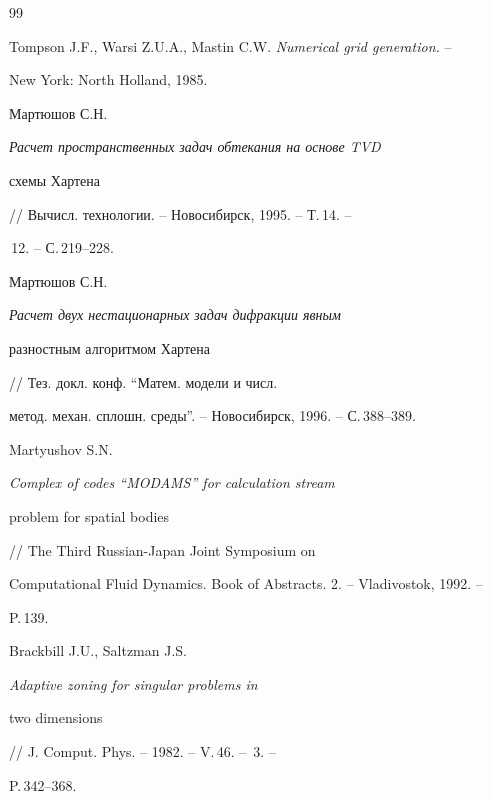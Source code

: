 \begin{thebibliography}{99} 


 




Tompson J.F., Warsi Z.U.A., Mastin C.W. {\em Numerical grid generation.} -- 


New York: North Holland, 1985. 


 




Мартюшов С.Н. {\em Расчет пространственных задач обтекания на основе TVD 


схемы Хартена} // Вычисл. технологии. -- Новосибирск, 1995. -- Т.\,14. --


\No\,12. -- С.\,219--228. 


 




Мартюшов С.Н. {\em Расчет двух нестационарных задач дифракции явным 


разностным алгоритмом Хартена} // Тез. докл. конф. ``Матем. модели и числ. 


метод. механ. сплошн. среды''. -- Новосибирск, 1996. -- С.\,388--389. 


 




Martyushov S.N. {\em Complex of codes ``MODAMS'' for calculation stream 


problem for spatial bodies} // The Third Russian-Japan Joint Symposium on 


Computational Fluid Dynamics. Book of Abstracts. 2. -- Vladivostok, 1992. -- 


P.\,139. 


 




Brackbill J.U., Saltzman J.S. {\em Adaptive zoning for singular problems in 


two dimensions} // J. Comput. Phys. -- 1982. -- V.\,46. -- \No\,3. -- 


P.\,342--368. 


 


\end{thebibliography} 


 


\vskip 2cm 


 






 


 


